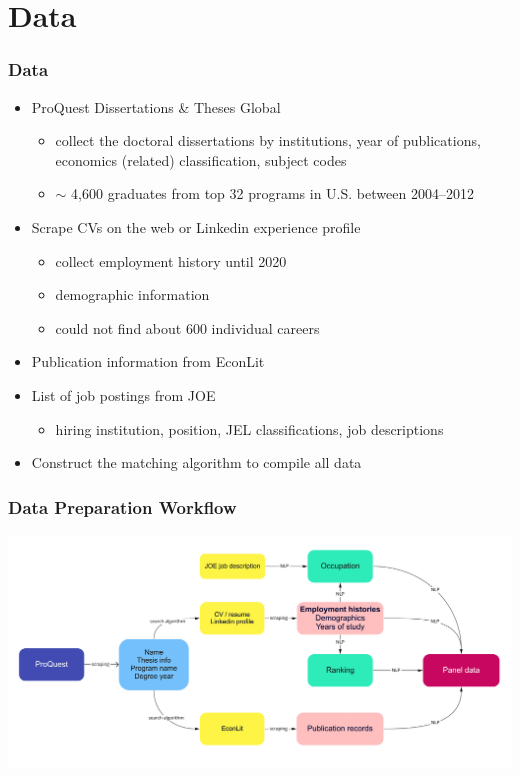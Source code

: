 \documentclass[10pt,svgnames,fragile]{beamer}
\begin{document}
{
	\AtBeginSection{}
\section{Data}
\begin{frame}[label=Data]
	\frametitle{Data}
		\begin{itemize}
			\item ProQuest Dissertations \& Theses Global
			\begin{itemize}
				\vspace{1 mm}
				\item collect the doctoral dissertations by institutions, year of publications, economics (related) classification, subject codes
				\vspace{1 mm}
				\item $\sim$ 4,600 graduates from top 32 programs in U.S. between 2004--2012 
			\end{itemize}
\vfill
			\item Scrape CVs on the web or Linkedin experience profile
			\begin{itemize}
				\vspace{1 mm}
				\item collect employment history until 2020
				\vspace{1 mm}
				\item demographic information
				\vspace{1 mm}
				\item could not find about 600 individual careers
			\end{itemize}
\vfill
			\item Publication information from EconLit
\vfill
			\item List of job postings from JOE
			\begin{itemize}
				\vspace{1 mm}
				\item hiring institution, position, JEL classifications, job descriptions  
			\end{itemize}		
			
\vfill
			\item Construct the matching algorithm to compile all data %
\vfill
		\end{itemize}
	\end{frame}

\begin{frame}
	\frametitle{Data Preparation Workflow}
	\includegraphics[width=\linewidth]{pic_flow.jpg}
\end{frame}

}
\end{document}
